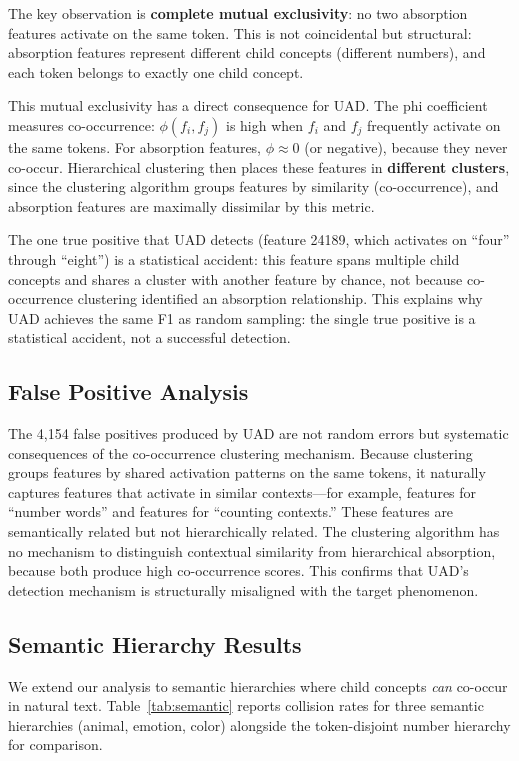 \documentclass{article}
\begin{document}
The key observation is \textbf{complete mutual exclusivity}: no two absorption features activate on the same token. This is not coincidental but structural: absorption features represent different child concepts (different numbers), and each token belongs to exactly one child concept.

This mutual exclusivity has a direct consequence for UAD. The phi coefficient measures co-occurrence: $\phi(f_i, f_j)$ is high when $f_i$ and $f_j$ frequently activate on the same tokens. For absorption features, $\phi \approx 0$ (or negative), because they never co-occur. Hierarchical clustering then places these features in \textbf{different clusters}, since the clustering algorithm groups features by similarity (co-occurrence), and absorption features are maximally dissimilar by this metric.

The one true positive that UAD detects (feature 24189, which activates on ``four'' through ``eight'') is a statistical accident: this feature spans multiple child concepts and shares a cluster with another feature by chance, not because co-occurrence clustering identified an absorption relationship. This explains why UAD achieves the same F1 as random sampling: the single true positive is a statistical accident, not a successful detection.

\subsection{False Positive Analysis}

The 4,154 false positives produced by UAD are not random errors but systematic consequences of the co-occurrence clustering mechanism. Because clustering groups features by shared activation patterns on the same tokens, it naturally captures features that activate in similar contexts---for example, features for ``number words'' and features for ``counting contexts.'' These features are semantically related but not hierarchically related. The clustering algorithm has no mechanism to distinguish contextual similarity from hierarchical absorption, because both produce high co-occurrence scores. This confirms that UAD's detection mechanism is structurally misaligned with the target phenomenon.

\subsection{Semantic Hierarchy Results}

We extend our analysis to semantic hierarchies where child concepts \emph{can} co-occur in natural text. Table~\ref{tab:semantic} reports collision rates for three semantic hierarchies (animal, emotion, color) alongside the token-disjoint number hierarchy for comparison.
\end{document}
